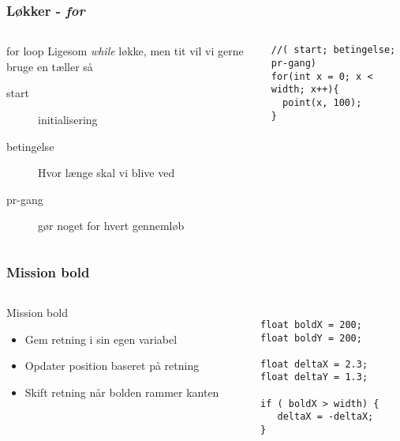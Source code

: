 \documentclass{beamer}
\begin{document}
\begin{frame}[fragile]
  \frametitle{Løkker - \emph{for}}
  \begin{columns}
    \begin{column}{0.45\textwidth}
      \begin{block}{for loop}
        Ligesom \emph{while} løkke, men tit vil vi gerne bruge en tæller så\\
        \begin{description}
        \item[start] initialisering
        \item[betingelse] Hvor længe skal vi blive ved
        \item[pr-gang] gør noget for hvert gennemløb
        \end{description}
        
      \end{block}
    \end{column}
    \begin{column}{0.55\textwidth}
\begin{verbatim} 
//( start; betingelse; pr-gang)
for(int x = 0; x < width; x++){
  point(x, 100);
}
\end{verbatim}
    \end{column}
  \end{columns}
\end{frame}

\begin{frame}[fragile]
  \frametitle{Mission bold}

  \begin{columns}
    \begin{column}{0.45\textwidth}
      \begin{block}{Mission bold}
        \begin{itemize}
        \item Gem retning i sin egen variabel
        \item Opdater position baseret på retning
        \item Skift retning når bolden rammer kanten
        \end{itemize}
      \end{block}
    \end{column}
    \begin{column}{0.55\textwidth}
\begin{verbatim} 

float boldX = 200;
float boldY = 200;

float deltaX = 2.3;
float deltaY = 1.3;

if ( boldX > width) {
   deltaX = -deltaX;
}

\end{verbatim}
    \end{column}
  \end{columns}
\end{frame}
\end{document}
